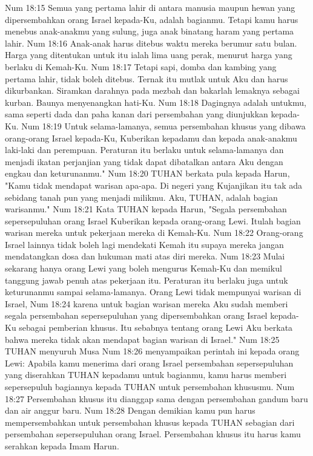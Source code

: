 Num 18:15  Semua yang pertama lahir di antara manusia maupun hewan yang dipersembahkan orang Israel kepada-Ku, adalah bagianmu. Tetapi kamu harus menebus anak-anakmu yang sulung, juga anak binatang haram yang pertama lahir.
Num 18:16  Anak-anak harus ditebus waktu mereka berumur satu bulan. Harga yang ditentukan untuk itu ialah lima uang perak, menurut harga yang berlaku di Kemah-Ku.
Num 18:17  Tetapi sapi, domba dan kambing yang pertama lahir, tidak boleh ditebus. Ternak itu mutlak untuk Aku dan harus dikurbankan. Siramkan darahnya pada mezbah dan bakarlah lemaknya sebagai kurban. Baunya menyenangkan hati-Ku.
Num 18:18  Dagingnya adalah untukmu, sama seperti dada dan paha kanan dari persembahan yang diunjukkan kepada-Ku.
Num 18:19  Untuk selama-lamanya, semua persembahan khusus yang dibawa orang-orang Israel kepada-Ku, Kuberikan kepadamu dan kepada anak-anakmu laki-laki dan perempuan. Peraturan itu berlaku untuk selama-lamanya dan menjadi ikatan perjanjian yang tidak dapat dibatalkan antara Aku dengan engkau dan keturunanmu."
Num 18:20  TUHAN berkata pula kepada Harun, "Kamu tidak mendapat warisan apa-apa. Di negeri yang Kujanjikan itu tak ada sebidang tanah pun yang menjadi milikmu. Aku, TUHAN, adalah bagian warisanmu."
Num 18:21  Kata TUHAN kepada Harun, "Segala persembahan sepersepuluhan orang Israel Kuberikan kepada orang-orang Lewi. Itulah bagian warisan mereka untuk pekerjaan mereka di Kemah-Ku.
Num 18:22  Orang-orang Israel lainnya tidak boleh lagi mendekati Kemah itu supaya mereka jangan mendatangkan dosa dan hukuman mati atas diri mereka.
Num 18:23  Mulai sekarang hanya orang Lewi yang boleh mengurus Kemah-Ku dan memikul tanggung jawab penuh atas pekerjaan itu. Peraturan itu berlaku juga untuk keturunanmu sampai selama-lamanya. Orang Lewi tidak mempunyai warisan di Israel,
Num 18:24  karena untuk bagian warisan mereka Aku sudah memberi segala persembahan sepersepuluhan yang dipersembahkan orang Israel kepada-Ku sebagai pemberian khusus. Itu sebabnya tentang orang Lewi Aku berkata bahwa mereka tidak akan mendapat bagian warisan di Israel."
Num 18:25  TUHAN menyuruh Musa
Num 18:26  menyampaikan perintah ini kepada orang Lewi: Apabila kamu menerima dari orang Israel persembahan sepersepuluhan yang diserahkan TUHAN kepadamu untuk bagianmu, kamu harus memberi sepersepuluh bagiannya kepada TUHAN untuk persembahan khususmu.
Num 18:27  Persembahan khusus itu dianggap sama dengan persembahan gandum baru dan air anggur baru.
Num 18:28  Dengan demikian kamu pun harus mempersembahkan untuk persembahan khusus kepada TUHAN sebagian dari persembahan sepersepuluhan orang Israel. Persembahan khusus itu harus kamu serahkan kepada Imam Harun.
